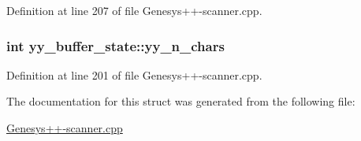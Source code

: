 Definition at line 207 of file Genesys++-\/scanner.\-cpp.

\hypertarget{structyy__buffer__state_a06406208824817acfec2183b79080945}{
\subsubsection[{yy\-\_\-n\-\_\-chars}]{\setlength{\rightskip}{0pt plus 5cm}int yy\-\_\-buffer\-\_\-state\-::yy\-\_\-n\-\_\-chars}}\label{structyy__buffer__state_a06406208824817acfec2183b79080945}


Definition at line 201 of file Genesys++-\/scanner.\-cpp.



The documentation for this struct was generated from the following file\-:\begin{DoxyCompactItemize}
\item 
\hyperlink{_genesys_09_09-scanner_8cpp}{Genesys++-\/scanner.\-cpp}\end{DoxyCompactItemize}
